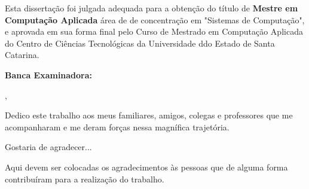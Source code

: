 % 
\begin{folhadeaprovacao}

	\begin{center}
		{\ABNTEXchapterfont\bfseries\imprimirautor}
		\vspace{6em}

			\ABNTEXchapterfont\bfseries\imprimirtitulo
		
	\end{center}
		\vspace{1em}
		{\justify
		Esta dissertação foi julgada adequada para a obtenção do título de
    	{\ABNTEXchapterfont\bfseries Mestre em Computação Aplicada}   
   		área de de concentração em "Sistemas de Computação",
   		 e aprovada em sua forma final pelo Curso de Mestrado em Computação Aplicada do Centro
   		 de Ciências Tecnológicas da Universidade ddo Estado de Santa Catarina.}
	
	\vspace{3em} 
	\noindent
	{\bfseries Banca Examinadora:}

    \vspace*{\fill}
    \begin{center}
    	\imprimirlocal,\,\imprimirfulldata
    \end{center}
\end{folhadeaprovacao}

\begin{dedicatoria}				
Dedico este trabalho aos meus familiares, amigos, colegas e professores que me acompanharam e me deram forças nessa magnífica trajetória.  
\end{dedicatoria}

\begin{agradecimentos}
Gostaria de agradecer...

Aqui devem ser colocadas os agradecimentos às pessoas que de alguma forma contribuíram para a realização do trabalho.
\end{agradecimentos}

